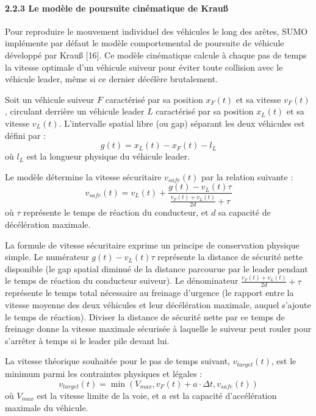 \documentclass[10pt, a4paper]{article}
\begin{document}
\paragraph{2.2.3 Le modèle de poursuite cinématique de
Krauß}\label{le-moduxe8le-de-poursuite-cinuxe9matique-de-krauuxdf}

Pour reproduire le mouvement individuel des véhicules le long des
arêtes, SUMO implémente par défaut le modèle comportemental de poursuite
de véhicule développé par Krauß {[}16{]}. Ce modèle cinématique calcule
à chaque pas de temps la vitesse optimale d'un véhicule suiveur pour
éviter toute collision avec le véhicule leader, même si ce dernier
décélère brutalement.

Soit un véhicule suiveur \(F\) caractérisé par sa position \(x_F(t)\) et
sa vitesse \(v_F(t)\), circulant derrière un véhicule leader \(L\)
caractérisé par sa position \(x_L(t)\) et sa vitesse \(v_L(t)\).
L'intervalle spatial libre (ou gap) séparant les deux véhicules est
défini par : \[g(t) = x_L(t) - x_F(t) - l_L\] où \(l_L\) est la longueur
physique du véhicule leader.

Le modèle détermine la vitesse sécuritaire \(v_{safe}(t)\) par la
relation suivante :
\[v_{safe}(t) = v_L(t) + \frac{g(t) - v_L(t)\tau}{\frac{v_F(t) + v_L(t)}{2d} + \tau}\]
où \(\tau\) représente le temps de réaction du conducteur, et \(d\) sa
capacité de décélération maximale.

La formule de vitesse sécuritaire exprime un principe de conservation
physique simple. Le numérateur \(g(t) - v_L(t)\tau\) représente la
distance de sécurité nette disponible (le gap spatial diminué de la
distance parcourue par le leader pendant le temps de réaction du
conducteur suiveur). Le dénominateur
\(\frac{v_F(t) + v_L(t)}{2d} + \tau\) représente le temps total
nécessaire au freinage d'urgence (le rapport entre la vitesse moyenne
des deux véhicules et leur décélération maximale, auquel s'ajoute le
temps de réaction). Diviser la distance de sécurité nette par ce temps
de freinage donne la vitesse maximale sécurisée à laquelle le suiveur
peut rouler pour s'arrêter à temps si le leader pile devant lui.

La vitesse théorique souhaitée pour le pas de temps suivant,
\(v_{target}(t)\), est le minimum parmi les contraintes physiques et
légales :
\[v_{target}(t) = \min\left( V_{max}, v_F(t) + a \cdot \Delta t, v_{safe}(t) \right)\]
où \(V_{max}\) est la vitesse limite de la voie, et \(a\) est la
capacité d'accélération maximale du véhicule.
\end{document}
